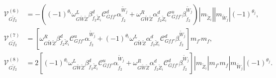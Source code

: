 \documentclass[final,3p,times]{elsarticle}
\begin{document}
\begin{align}
\mathcal{V}_{G \tilde{f}_2}^{(6)} &= -((-1)^{\theta_i}\omega_{G \tilde{W} \tilde{Z}}^L \beta_{\tilde{f}_2 \tilde{Z}_i}^{d} \mathcal{C}_{G f f'}^d \alpha_{\tilde{f}_2}^{\tilde{W}_j} + \omega_{G \tilde{W} \tilde{Z}}^R \alpha_{\tilde{f}_2 \tilde{Z}_i}^{d} \mathcal{C}_{G f f'}^u \beta_{\tilde{f}_2}^{\tilde{W}_j})|m_{\tilde{Z}_i}||m_{\tilde{W}_j}|(-1)^{\theta_j}, \\
\mathcal{V}_{G \tilde{f}_2}^{(7)} &= [\omega_{G \tilde{W} \tilde{Z}}^R \beta_{\tilde{f}_2 \tilde{Z}_i}^{d} \mathcal{C}_{G f f'}^u \alpha_{\tilde{f}_2}^{\tilde{W}_j} + (-1)^{\theta_i}\omega_{G \tilde{W} \tilde{Z}}^L \alpha_{\tilde{f}_2 \tilde{Z}_i}^{d} \mathcal{C}_{G f f'}^d \beta_{\tilde{f}_2}^{\tilde{W}_j}]m_{f'}m_{f} ,\\
\mathcal{V}_{G \tilde{f}_2}^{(8)} &= 2[(-1)^{\theta_i}\omega_{G \tilde{W} \tilde{Z}}^L \beta_{\tilde{f}_2 \tilde{Z}_i}^{d} \mathcal{C}_{G f f'}^u \alpha_{\tilde{f}_2}^{\tilde{W}_j} + \omega_{G \tilde{W} \tilde{Z}}^R \alpha_{\tilde{f}_2 \tilde{Z}_i}^{d} \mathcal{C}_{G f f'}^d \beta_{\tilde{f}_2}^{\tilde{W}_j}]|m_{\tilde{Z}_i}|m_{f'}m_{f}|m_{\tilde{W}_j}|(-1)^{\theta_j}.
\end{align}
\end{document}
